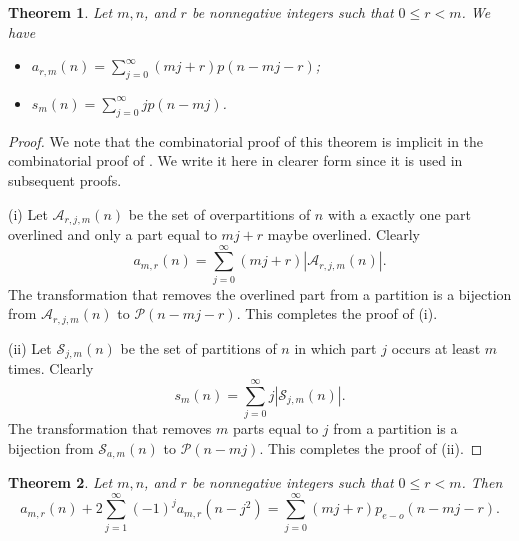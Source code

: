 \documentclass{amsart}
\newtheorem{theorem}{Theorem}[section]
\theoremstyle{definition}
\begin{document}
\begin{theorem}{\cite[Theorem 1.3]{M23}} \label{T1.3}Let $m,n$, and $r$ be nonnegative integers such that $0\leq r<m$. We have 
\begin{itemize}
\item[(i)] $\displaystyle a_{r,m}(n)=\sum_{j=0}^\infty (mj+r)p(n-mj-r)$; 
\item[(ii)] $\displaystyle s_m(n)= \sum_{j=0}^\infty jp(n-mj)$.
\end{itemize}
\end{theorem}

\begin{proof} We note that the combinatorial proof of this theorem is implicit in the combinatorial proof of \cite[Theorem 1.6]{M23}. We write it here in clearer form since it is used in subsequent proofs. 

(i) Let $\mathcal A_{r,j, m}(n)$ be the set of overpartitions of $n$ with a exactly one part  overlined and only a part equal to $mj+r$ maybe overlined. Clearly $$a_{m,r}(n)= \sum_{j=0}^\infty (mj+r)|\mathcal A_{r,j,m}(n)|.$$ The transformation that removes the overlined part from a partition is a bijection from $\mathcal A_{r,j,m}(n)$ to $\mathcal P(n-mj-r)$. This completes the proof of (i). 

(ii) Let $\mathcal S_{j,m}(n)$ be the set of partitions of $n$ in which part $j$ occurs at least $m$ times. Clearly $$s_{m}(n)= \sum_{j=0}^\infty j|\mathcal S_{j,m}(n)|.$$ The transformation that removes $m$ parts equal to $j$ from a partition is a bijection from $\mathcal S_{a,m}(n)$ to $\mathcal P(n-mj)$. This completes the proof of (ii). 
\end{proof}

\begin{theorem}{\cite[Corollary 4.2]{M23}} \label{Cor4.2}Let $m,n$, and $r$ be nonnegative integers such that $0\leq r<m$. Then \begin{equation} \label{C4.2} a_{m,r}(n)+2\sum_{j=1}^\infty (-1)^j a_{m,r}(n-j^2)= \sum_{j=0}^\infty (mj+r)p_{e-o}(n-mj-r).\end{equation}
\end{theorem}
\end{document}
